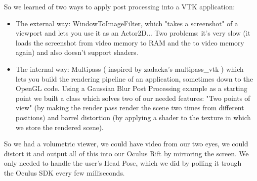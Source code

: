 \documentclass[11pt]{article} %
\begin{document}
So we learned of two ways to apply post processing into a VTK application:
\begin{itemize}
\item The external way: WindowToImageFilter, which "takes a screenshot" of a viewport and lets you use it as an Actor2D... Two problems: it's very slow (it loads the screenshot from video memory to RAM and the to video memory again) and also doesn't support shaders.
\item The internal way: Multipass ( inspired by zadacka's multipass\_vtk ) which lets you build the rendering pipeline of an application, sometimes down to the OpenGL code. Using a Gaussian Blur Post Processing example as a starting point we built a class which solves two of our needed features: "Two points of view" (by making the render pass render the scene two times from different positions) and barrel distortion (by applying a shader to the texture in which we store the rendered scene).
\end{itemize}
So we had a volumetric viewer, we could have video from our two eyes, we could distort it and output all of this into our Oculus Rift by mirroring the screen.
We only needed to handle the user's Head Pose, which we did by polling it trough the Oculus SDK every few milliseconds.
\end{document}
